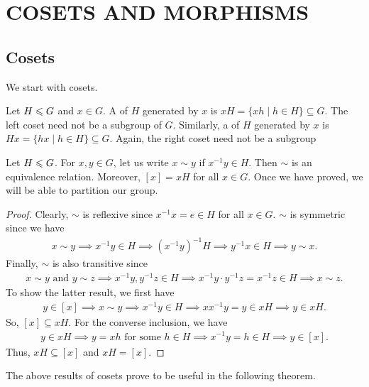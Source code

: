 \chapter{COSETS AND MORPHISMS}

\section{Cosets}
We start with cosets.

\begin{definition}
    Let $H \leqslant G$ and $x \in G$. A  of $H$ generated by $x$ is $xH = \{xh \mid h \in H\} \subseteq G$. The left coset need not be a subgroup of $G$. Similarly, a  of $H$ generated by $x$ is $Hx = \{hx \mid h \in H\} \subseteq G$. Again, the right coset need not be a subgroup
\end{definition}

Let $H \leqslant G$. For $x,y \in G$, let us write $x \sim y$ if $x^{-1}y \in H$. Then $\sim$ is an equivalence relation. Moreover, $[x] = xH$ for all $x \in G$. Once we have proved, we will be able to partition our group.

\begin{proof}
    Clearly, $\sim$ is reflexive since $x^{-1}x = e \in H$ for all $x \in G$. $\sim$ is symmetric since we have
    \begin{align}
        x \sim y \implies x^{-1}y \in H \implies (x^{-1}y)^{-1} H \implies y^{-1}x \in H \implies y \sim x.
    \end{align}
    Finally, $\sim$ is also transitive since
    \begin{align}
        x \sim y \text{ and } y \sim z \implies x^{-1}y,y^{-1}z \in H \implies x^{-1}y \cdot y^{-1}z = x^{-1}z \in H \implies x \sim z.
    \end{align}
    To show the latter result, we first have
    \begin{align}
        y \in [x] \implies x \sim y \implies x^{-1}y \in H \implies xx^{-1}y = y \in xH \implies y \in xH.
    \end{align}
    So, $[x] \subseteq xH$. For the converse inclusion, we have
    \begin{align}
        y \in xH \implies y = xh \text{ for some } h \in H \implies x^{-1}y = h \in H \implies y \in [x].
    \end{align}
    Thus, $xH \subseteq [x]$ and $xH = [x]$.
\end{proof}

The above results of cosets prove to be useful in the following theorem.

